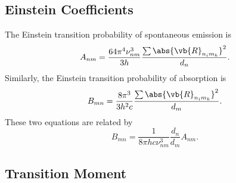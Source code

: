 \subsection{Einstein Coefficients}

The Einstein transition probability of spontaneous emission is \cite[21]{herzbergMolecularSpectraMolecular1950}
\begin{equation*}
    A_{nm} = \frac{64\pi^4\nu_{nm}^3}{3h}\frac{\sum\abs{\vb{R}_{n_im_k}}^2}{d_n}.
\end{equation*}
Similarly, the Einstein transition probability of absorption is
\begin{equation*}
    B_{mn} = \frac{8\pi^3}{3h^2c}\frac{\sum\abs{\vb{R}_{n_im_k}}^2}{d_m}.
\end{equation*}
These two equations are related by
\begin{equation*}
    B_{mn} = \frac{1}{8\pi hc\nu_{nm}^3}\frac{d_n}{d_m}A_{nm}.
\end{equation*}

\subsection{Transition Moment}

